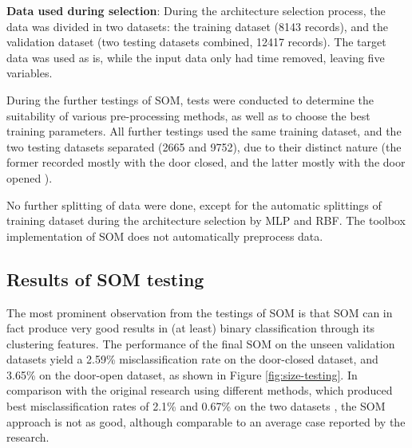 \documentclass[10pt, oneside]{article}
\begin{document}
\textbf{Data used during selection}: During the architecture selection process, the data was divided in two datasets: the training dataset (8143 records), and the validation dataset (two testing datasets combined, 12417 records). The target data was used as is, while the input data only had time removed, leaving five variables.

During the further testings of SOM, tests were conducted to determine the suitability of various pre-processing methods, as well as to choose the best training parameters. All further testings used the same training dataset, and the two testing datasets separated (2665 and 9752), due to their distinct nature (the former recorded mostly with the door closed, and the latter mostly with the door opened \cite[Tb. 5]{candanedo2016accurate}). 

No further splitting of data were done, except for the automatic splittings of training dataset during the architecture selection by MLP and RBF. The toolbox implementation of SOM does not automatically preprocess data.

\subsection{Results of SOM testing}

The most prominent observation from the testings of SOM is that SOM can in fact produce very good results in (at least) binary classification through its clustering features. The performance of the final SOM on the unseen validation datasets yield a 2.59\% misclassification rate on the door-closed dataset, and 3.65\% on the door-open dataset, as shown in Figure \ref{fig:size-testing}. In comparison with the original research using different methods, which produced best misclassification rates of 2.1\% and 0.67\% on the two datasets \cite[p. 36]{candanedo2016accurate}, the SOM approach is not as good, although comparable to an average case reported by the research. 
\end{document}
